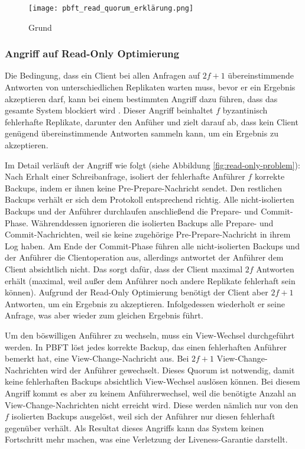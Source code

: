 \documentclass[nonacm,sigconf,natbib=false]{acmart}
\begin{document}
\begin{figure}
  \centering
  \texttt{[image: pbft\_read\_quorum\_erklärung.png]}
  \caption{Grund}
  \label{fig:pbft-optimization}
\end{figure}

\subsubsection{Angriff auf Read-Only Optimierung}

Die Bedingung, dass ein Client bei allen Anfragen auf $2f+1$ übereinstimmende Antworten von unterschiedlichen Replikaten warten muss, bevor er ein Ergebnis akzeptieren darf, kann bei einem bestimmten Angriff dazu führen, dass das gesamte System blockiert wird \cite{pbft-liveness-problem}. Dieser Angriff beinhaltet $f$ byzantinisch fehlerhafte Replikate, darunter den Anfüher und zielt darauf ab, dass kein Client genügend übereinstimmende Antworten sammeln kann, um ein Ergebnis zu akzeptieren.

Im Detail verläuft der Angriff wie folgt (siehe Abbildung \ref{fig:read-only-problem}): Nach Erhalt einer Schreibanfrage, isoliert der fehlerhafte Anführer $f$ korrekte Backups, indem er ihnen keine Pre-Prepare-Nachricht sendet. Den restlichen Backups verhält er sich dem Protokoll entsprechend richtig. Alle nicht-isolierten Backups und der Anführer durchlaufen anschließend die Prepare- und Commit-Phase. Währenddessen ignorieren die isolierten Backups alle Prepare- und Commit-Nachrichten, weil sie keine zugehörige Pre-Prepare-Nachricht in ihrem Log haben. Am Ende der Commit-Phase führen alle nicht-isolierten Backups und der Anführer die Clientoperation aus, allerdings antwortet der Anführer dem Client absichtlich nicht. Das sorgt dafür, dass der Client maximal $2f$ Antworten erhält (maximal, weil außer dem Anführer noch andere Replikate fehlerhaft sein können). Aufgrund der Read-Only Optimierung benötigt der Client aber $2f+1$ Antworten, um ein Ergebnis zu akzeptieren. Infolgedessen wiederholt er seine Anfrage, was aber wieder zum gleichen Ergebnis führt.

Um den böswilligen Anführer zu wechseln, muss ein View-Wechsel durchgeführt werden. In PBFT löst jedes korrekte Backup, das einen fehlerhaften Anführer bemerkt hat, eine View-Change-Nachricht aus. Bei $2f+1$ View-Change-Nachrichten wird der Anführer gewechselt. Dieses Quorum ist notwendig, damit keine fehlerhaften Backups absichtlich View-Wechsel auslösen können. Bei diesem Angriff kommt es aber zu keinem Anführerwechsel, weil die benötigte Anzahl an View-Change-Nachrichten nicht erreicht wird. Diese werden nämlich nur von den $f$ isolierten Backups ausgelöst, weil sich der Anführer nur diesen fehlerhaft gegenüber verhält. Als Resultat dieses Angriffs kann das System keinen Fortschritt mehr machen, was eine Verletzung der Liveness-Garantie darstellt.
\end{document}
